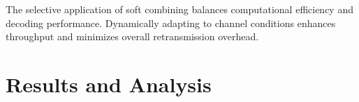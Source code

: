 \documentclass[sn-mathphys-num]{sn-jnl}
\theoremstyle{thmstyleone}
\theoremstyle{thmstyletwo}%
\theoremstyle{thmstylethree}%
\begin{document}



    




The selective application of soft combining balances computational efficiency and decoding performance. Dynamically adapting to channel conditions enhances throughput and minimizes overall retransmission overhead.

\section{Results and Analysis} \label{s4}
\end{document}
